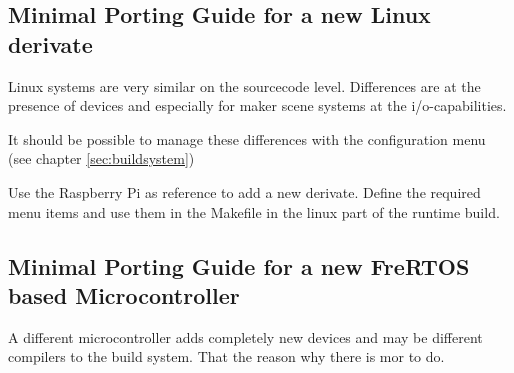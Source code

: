\subsection{Minimal Porting Guide for a new Linux derivate}
Linux systems are very similar on the sourcecode level. Differences are
at the presence of devices and especially for maker scene systems at 
the i/o-capabilities.

It should be possible to manage these differences with the 
configuration menu (see chapter \ref{sec:buildsystem})

Use the Raspberry Pi as reference to  add a new derivate. 
Define the required menu items and use them in the Makefile in the 
linux part of the runtime build.

\subsection{Minimal Porting Guide for a new FreRTOS based Microcontroller}
A different microcontroller adds completely new devices and may be different
compilers to the build system. That the reason why there is mor to do.

